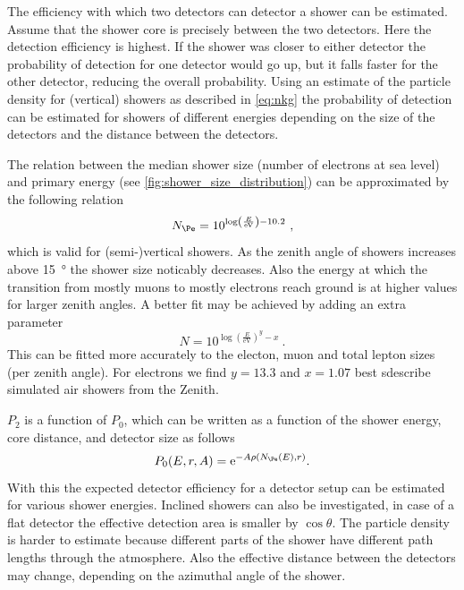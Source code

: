 The efficiency with which two detectors can detector a shower can be estimated. Assume that the shower core is precisely between the two detectors. Here the detection efficiency is highest. If the shower was closer to either detector the probability of detection for one detector would go up, but it falls faster for the other detector, reducing the overall probability. Using an estimate of the particle density for (vertical) showers as described in \cref{eq:nkg} the probability of detection can be estimated for showers of different energies depending on the size of the detectors and the distance between the detectors.

The relation between the median shower size (number of electrons at sea level) and primary energy (see \cref{fig:shower_size_distribution}) can be approximated by the following relation
%
\begin{equation}
    N_{\Pe} = 10^{\log\left(\frac{E}{\si{\eV}}\right) - 10.2} \ ,
\end{equation}
%
which is valid for (semi-)vertical showers. As the zenith angle of showers increases above \SI{15}{\degree} the shower size noticably decreases. Also the energy at which the transition from mostly muons to mostly electrons reach ground is at higher values for larger zenith angles. A better fit may be achieved by adding an extra parameter
%
\begin{equation}
    N = 10^{\log\left(\frac{E}{\si{\eV}}\right)^y - x} \ .
\end{equation}
%
This can be fitted more accurately to the electon, muon and total lepton sizes (per zenith angle). For electrons we find $y = 13.3$ and $x = 1.07$ best sdescribe simulated air showers from the Zenith.

$P_2$ is a function of $P_0$, which can be written as a function of the shower energy, core distance, and detector size as follows
%
\begin{equation}
    P_0(E, r, A) = \mathrm{e}^{-A\rho(N_{\Pe}(E), r)} \\ .
\end{equation}
%
With this the expected detector efficiency for a detector setup can be estimated for various shower energies. Inclined showers can also be investigated, in case of a flat detector the effective detection area is smaller by $\cos \theta$. The particle density is harder to estimate because different parts of the shower have different path lengths through the atmosphere. Also the effective distance between the detectors may change, depending on the azimuthal angle of the shower.


